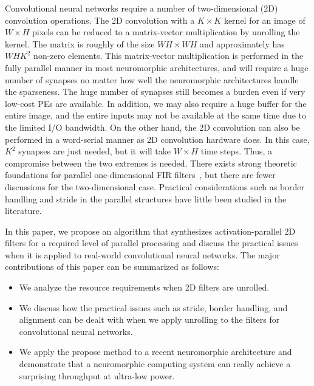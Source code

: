 \documentclass[journal]{IEEEtran}
\begin{document}
Convolutional neural networks require a number of two-dimensional (2D) convolution operations. The 2D convolution with a $K\times K$ kernel for an image of $W\times H$ pixels can be reduced to a matrix-vector multiplication by unrolling the kernel. The matrix is roughly of the size $WH \times WH$ and approximately has $WHK^2$ non-zero elements. This matrix-vector multiplication is performed in the fully parallel manner in most neuromorphic architectures, and will require a huge number of synapses no matter how well the neuromorphic architectures handle the sparseness. The huge number of synapses still becomes a burden even if very low-cost PEs are available. In addition, we may also require a huge buffer for the entire image, and the entire inputs may not be available at the same time due to the limited I/O bandwidth. On the other hand, the 2D convolution can also be performed in a word-serial manner as 2D convolution hardware does. In this case, $K^2$ synapses are just needed, but it will take $W \times H$ time steps. Thus, a compromise between the two extremes is needed. There exists strong theoretic foundations for parallel one-dimensional FIR filters~\cite{parhi2007vlsi}, but there are fewer discussions for the two-dimensional case. Practical considerations such as border handling and stride in the parallel structures have little been studied in the literature.
 
In this paper, we propose an algorithm that synthesizes activation-parallel 2D filters for a required level of parallel processing and discuss the practical issues when it is applied to real-world convolutional neural networks. The major contributions of this paper can be summarized as follows:
\begin{itemize}
\item We analyze the resource requirements when 2D filters are unrolled.
\item We discuss how the practical issues such as stride, border handling, and alignment can be dealt with when we apply unrolling to the filters for convolutional neural networks.
\item We apply the propose method to a recent neuromorphic architecture and demonstrate that a neuromorphic computing system can really achieve a surprising throughput at ultra-low power.
\end{itemize} 
\end{document}
